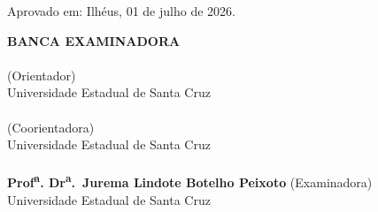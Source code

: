 \documentclass[
    12pt,
    openright,
    oneside,
    a4paper,
    english,
    brazil
]{abntex2}
\begin{document}
\begin{folhadeaprovacao}
  \begin{center}
    {\ABNTEXchapterfont\large\imprimirautor}
    \vspace*{\fill}\vspace*{\fill}
    \begin{center}
      \ABNTEXchapterfont\bfseries\Large\imprimirtitulo
    \end{center}
    \vspace*{\fill}
    \hspace{.45\textwidth}
    \begin{minipage}{.5\textwidth}
        \imprimirpreambulo
    \end{minipage}%
  
    \vspace*{\fill}
  \end{center}

  Aprovado em: Ilhéus, 01 de julho de 2026.
  
  \begin{center}
    \vspace*{0.5cm}
    \textbf{BANCA EXAMINADORA} \\
    
    \vspace*{0.5cm}
    \hrulefill \\
    \textbf{\imprimirorientador} (Orientador) \\
    Universidade Estadual de Santa Cruz \\
    
    \vspace*{0.5cm}
    \hrulefill \\
    \textbf{\imprimircoorientador} (Coorientadora) \\
    Universidade Estadual de Santa Cruz \\
    
    \vspace*{0.5cm}
    \hrulefill \\
    \textbf{Prof\textsuperscript{a}. Dr\textsuperscript{a}.\ Jurema Lindote Botelho Peixoto} (Examinadora) \\
    Universidade Estadual de Santa Cruz \\
  \end{center}
\end{folhadeaprovacao}
\end{document}
